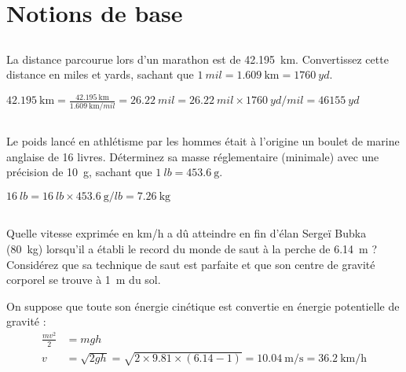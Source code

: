 \section{Notions de base}

\subsection{}
La distance parcourue lors d'un marathon est de \SI{42,195}{\kilo\meter}. Convertissez cette distance en miles et yards, sachant que $\SI{1}{mil} = \SI{1.609}{\kilo\meter} = \SI{1760}{yd}$.

\begin{solution}
    $ \SI{42.195}{\kilo\meter} = \frac{\SI{42.195}{\kilo\meter}}{\SI{1.609}{\kilo\meter\per mil}} = \SI{26.22}{mil} = \SI{26.22}{mil} \times \SI{1760}{yd \per mil} = \SI{46155}{yd} $
\end{solution}

\subsection{}
Le poids lancé en athlétisme par les hommes était à l'origine un boulet de marine anglaise de 16 livres. Déterminez sa masse réglementaire (minimale) avec une précision de \SI{10}{\gram}, sachant que $\SI{1}{lb} = \SI{453.6}{\gram}$.

\begin{solution}
    $ \SI{16}{lb} = \SI{16}{lb} \times \SI{453.6}{\gram\per lb} = \SI{7.26}{\kilo\gram} $
\end{solution}

\subsection{}
Quelle vitesse exprimée en km/h a dû atteindre en fin d'élan Sergeï Bubka (\SI{80}{\kilo\gram}) lorsqu'il a établi le record du monde de saut à la perche de \SI{6.14}{\meter} ? Considérez que sa technique de saut est parfaite et que son centre de gravité corporel se trouve à \SI{1}{\meter} du sol.

\begin{solution}
    On suppose que toute son énergie cinétique est convertie en énergie potentielle de gravité :
    \begin{align*}
        \frac{mv^2}{2} &= mgh \\
        v &= \sqrt{2gh} = \sqrt{2 \times 9.81 \times (6.14 - 1)} = \SI{10.04}{\meter\per\second} = \SI{36.2}{\kilo\meter\per\hour}
    \end{align*}
\end{solution}

